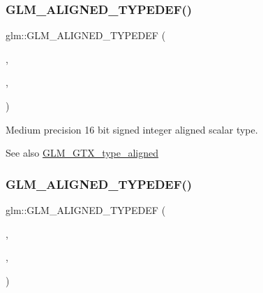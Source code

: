 \subsubsection{\texorpdfstring{G\+L\+M\+\_\+\+A\+L\+I\+G\+N\+E\+D\+\_\+\+T\+Y\+P\+E\+D\+E\+F()}{GLM\_ALIGNED\_TYPEDEF()}\hspace{0.1cm}{\footnotesize\ttfamily [22/209]}}
{\footnotesize\ttfamily glm\+::\+G\+L\+M\+\_\+\+A\+L\+I\+G\+N\+E\+D\+\_\+\+T\+Y\+P\+E\+D\+EF (\begin{DoxyParamCaption}\item[{\hyperlink{group__gtc__type__precision_ga8454fc6a82c7bb787d0ac9663e08f63d}{mediump\+\_\+i16}}]{,  }\item[{aligned\+\_\+mediump\+\_\+i16}]{,  }\item[{2}]{ }\end{DoxyParamCaption})}

Medium precision 16 bit signed integer aligned scalar type. \begin{DoxySeeAlso}{See also}
\hyperlink{group__gtx__type__aligned}{G\+L\+M\+\_\+\+G\+T\+X\+\_\+type\+\_\+aligned} 
\end{DoxySeeAlso}
\mbox{\label{group__gtx__type__aligned_ga63b882e29170d428463d99c3d630acc6}} 
\subsubsection{\texorpdfstring{G\+L\+M\+\_\+\+A\+L\+I\+G\+N\+E\+D\+\_\+\+T\+Y\+P\+E\+D\+E\+F()}{GLM\_ALIGNED\_TYPEDEF()}\hspace{0.1cm}{\footnotesize\ttfamily [23/209]}}
{\footnotesize\ttfamily glm\+::\+G\+L\+M\+\_\+\+A\+L\+I\+G\+N\+E\+D\+\_\+\+T\+Y\+P\+E\+D\+EF (\begin{DoxyParamCaption}\item[{\hyperlink{group__gtc__type__precision_ga5e00ec824eb55968a6b6496f294d8c07}{mediump\+\_\+i32}}]{,  }\item[{aligned\+\_\+mediump\+\_\+i32}]{,  }\item[{4}]{ }\end{DoxyParamCaption})}


